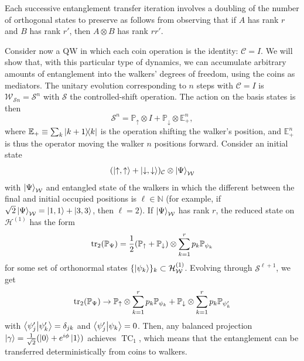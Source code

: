 \documentclass[
	aps, pra,
	superscriptaddress, twocolumn,
	floatfix,
	10pt
]{revtex4-1}
\newcommand{\on}[1]{\operatorname{#1}}
\newcommand{\parTitle}[1]{\noindent{\color{Mahogany}(\emph{#1})}}
\newcommand{\EE}{\mathbb{E}}
\newcommand{\NN}{\mathbb{N}}
\newcommand{\PP}{\mathbb{P}}
\newcommand{\calC}{{\mathcal{C}}}
\newcommand{\calH}{{\mathcal{H}}}
\newcommand{\calS}{{\mathcal{S}}}
\newcommand{\calU}{{\mathcal{U}}}
\newcommand{\calW}{{\mathcal{W}}}
\newcommand{\HW}{\calH_\calW}
\renewcommand{\parTitle}[1]{}
\begin{document}
Each successive entanglement transfer iteration involves a doubling of the number of orthogonal states to preserve as follows from observing that if $A$ has rank $r$ and $B$ has rank $r'$, then $A\otimes B$ has rank $rr'$.

\parTitle{QWs with $C=I$}
Consider now a QW in which each coin operation is the identity: $\calC=I$.
We will show that, with this particular type of dynamics, we can accumulate arbitrary amounts of entanglement into the walkers' degrees of freedom, using the coins as mediators.
The unitary evolution corresponding to $n$ steps with $\calC=I$ is $\calW_{\calS n}=\calS^n$ with $\calS$ the controlled-shift operation.
The action on the basis states is then
\begin{equation}
    \calS^n = \PP_\uparrow \otimes I + \PP_\downarrow\otimes \EE_+^n,
\end{equation}
where $\EE_+\equiv \sum_k\ketbra{k+1}{k}$ is the operation shifting the walker's position, and $\EE_+^n$ is thus the operator moving the walker $n$ positions forward.
Consider an initial state
\begin{equation}
    (\ket{\uparrow,\uparrow}+\ket{\downarrow,\downarrow})_\calC\otimes
    \ket{\Psi}_\calW
\end{equation}
with $\ket{\Psi}_\calW$ and entangled state of the walkers in which the different between the final and initial occupied positions is $\ell\in\NN$
(for example, if $\sqrt2\ket{\Psi}_\calW=\ket{1,1}+\ket{3,3}$, then $\ell=2$).
If $\ket{\Psi}_\calW$ has rank $r$, the reduced state on $\calH^{(1)}$ has the form
\begin{equation}
    \tr_2(\PP_{\Psi}) = \frac12 (\PP_\uparrow+\PP_\downarrow)\otimes\sum_{k=1}^r p_k \PP_{\psi_k}
\end{equation}
for some set of orthonormal states $\{\ket{\psi_k}\}_k\subset\HW^{(1)}$.
Evolving through $\calS^{\ell+1}$, we get
\begin{equation}
    \tr_2(\PP_{\Psi}) \to
    \PP_\uparrow\otimes\sum_{k=1}^r p_k \PP_{\psi_k} +
    \PP_\downarrow\otimes\sum_{k=1}^r p_k \PP_{\psi_k'}
\end{equation}
with $\braket{\psi_j'}{\psi_k'}=\delta_{jk}$ and $\braket{\psi_j'}{\psi_k}=0$.
Then, any balanced projection $\ket\gamma=\frac{1}{\sqrt2}(\ket0+e^{i\phi}\ket1)$ achieves $\on{TC}_1$, which means that the entanglement can be transferred deterministically from coins to walkers. 
\end{document}
